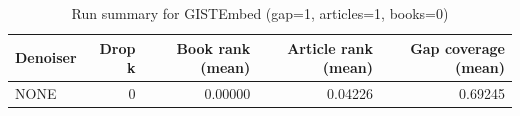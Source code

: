 \begin{table}
\caption{Run summary for GISTEmbed (gap=1, articles=1, books=0)}
\label{tab:summary_gap1_gistembed_a1_b0}
\begin{tabular}{lrrrr}
\toprule
Denoiser & Drop k & Book rank (mean) & Article rank (mean) & Gap coverage (mean) \\
\midrule
NONE & 0 & 0.00000 & 0.04226 & 0.69245 \\
\bottomrule
\end{tabular}
\end{table}